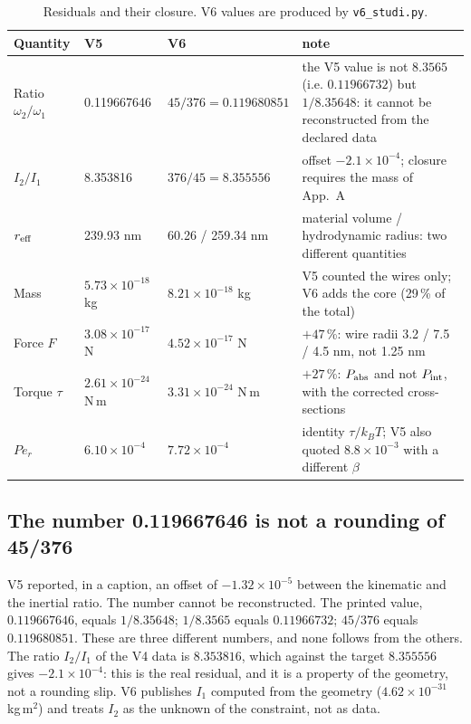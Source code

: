 \documentclass[11pt,a4paper]{article}
\begin{document}
\begin{table}[H]
\centering\small
\caption{Residuals and their closure. V6 values are produced by
\texttt{v6\_studi.py}.}
\label{tab:residui}
\begin{tabular}{p{2.9cm}p{3.0cm}p{3.0cm}p{5.5cm}}
\hline
Quantity & V5 & V6 & note \\
\hline
Ratio $\omega_2/\omega_1$ & 0.119667646 & $45/376=0.119680851$ & the V5 value is not
$8.3565$ (i.e. $0.11966732$) but $1/8.35648$: it cannot be reconstructed from the
declared data \\
$I_2/I_1$ & 8.353816 & $376/45=8.355556$ & offset $-2.1\times10^{-4}$; closure
requires the mass of App.~A \\
$r_{\rm eff}$ & 239.93 nm & 60.26 / 259.34 nm & material volume / hydrodynamic radius:
two different quantities \\
Mass & $5.73\times10^{-18}$ kg & $8.21\times10^{-18}$ kg & V5 counted the wires only; V6
adds the core (29\,\% of the total) \\
Force $F$ & $3.08\times10^{-17}$ N & $4.52\times10^{-17}$ N & $+47$\,\%: wire radii
3.2 / 7.5 / 4.5 nm, not 1.25 nm \\
Torque $\tau$ & $2.61\times10^{-24}$ N\,m & $3.31\times10^{-24}$ N\,m & $+27$\,\%:
$P_{\rm abs}$ and not $P_{\rm int}$, with the corrected cross-sections \\
$Pe_r$ & $6.10\times10^{-4}$ & $7.72\times10^{-4}$ & identity $\tau/k_BT$; V5 also
quoted $8.8\times10^{-3}$ with a different $\beta$ \\
\hline
\end{tabular}
\end{table}

\subsection{The number 0.119667646 is not a rounding of 45/376}

V5 reported, in a caption, an offset of $-1.32\times10^{-5}$ between the kinematic and
the inertial ratio. The number cannot be reconstructed. The printed value,
$0.119667646$, equals $1/8.35648$; $1/8.3565$ equals $0.11966732$; $45/376$ equals
$0.119680851$. These are three different numbers, and none follows from the others.
The ratio $I_2/I_1$ of the V4 data is $8.353816$, which against the target $8.355556$
gives $-2.1\times10^{-4}$: this is the real residual, and it is a property of the
geometry, not a rounding slip. V6 publishes $I_1$ computed from the geometry
($4.62\times10^{-31}$\,kg\,m$^2$) and treats $I_2$ as the unknown of the constraint,
not as data.
\end{document}
